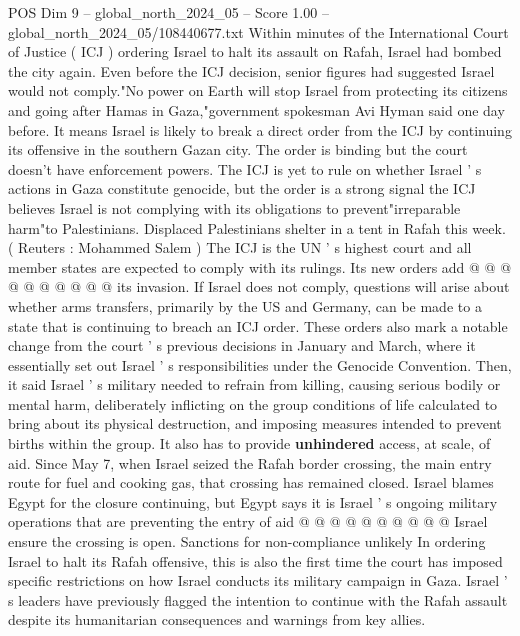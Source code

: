 \begin{textsample}{POS Dim 9 – global\_north\_2024\_05 – Score 1.00 – global\_north\_2024\_05/108440677.txt}  \label{ex:f9_pos_295}
Within minutes of the International Court of Justice ( ICJ ) ordering Israel to halt its assault on Rafah, Israel had bombed the city again.
Even before the ICJ decision, senior figures had suggested Israel would not comply."No power on Earth will stop Israel from protecting its citizens and going after Hamas in Gaza,"government spokesman Avi Hyman said one day before.
It means Israel is likely to break a direct order from the ICJ by continuing its offensive in the southern Gazan city.
The order is binding but the court doesn't have enforcement powers.
The ICJ is yet to rule on whether Israel ' s actions in Gaza constitute genocide, but the order is a strong signal the ICJ believes Israel is not complying with its obligations to prevent"irreparable harm"to Palestinians.
Displaced Palestinians shelter in a tent in Rafah this week. ( Reuters : Mohammed Salem ) The ICJ is the UN ' s highest court and all member states are expected to comply with its rulings.
Its new orders add @ @ @ @ @ @ @ @ @ @ its invasion.
If Israel does not comply, questions will arise about whether arms transfers, primarily by the US and Germany, can be made to a state that is continuing to breach an ICJ order.
These orders also mark a notable change from the court ' s previous decisions in January and March, where it essentially set out Israel ' s responsibilities under the Genocide Convention.
Then, it said Israel ' s military needed to refrain from killing, causing serious bodily or mental harm, deliberately inflicting on the group conditions of life calculated to bring about its physical destruction, and imposing measures intended to prevent births within the group.
It also has to provide \textbf{unhindered} access, at scale, of aid.
Since May 7, when Israel seized the Rafah border crossing, the main entry route for fuel and cooking gas, that crossing has remained closed.
Israel blames Egypt for the closure continuing, but Egypt says it is Israel ' s ongoing military operations that are preventing the entry of aid @ @ @ @ @ @ @ @ @ @ Israel ensure the crossing is open.
Sanctions for non-compliance unlikely In ordering Israel to halt its Rafah offensive, this is also the first time the court has imposed specific restrictions on how Israel conducts its military campaign in Gaza.
Israel ' s leaders have previously flagged the intention to continue with the Rafah assault despite its humanitarian consequences and warnings from key allies.

\end{textsample}
